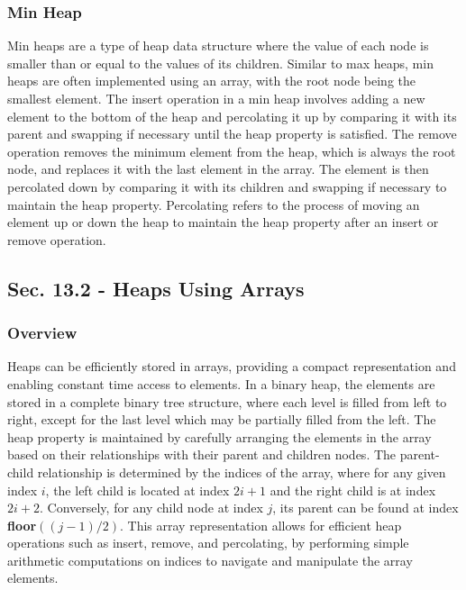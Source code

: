 \subsubsection{Min Heap}

Min heaps are a type of heap data structure where the value of each node is smaller than or equal to the values of its children. Similar to max heaps, min heaps are often implemented using an array, with 
the root node being the smallest element. The insert operation in a min heap involves adding a new element to the bottom of the heap and percolating it up by comparing it with its parent and swapping if 
necessary until the heap property is satisfied. The remove operation removes the minimum element from the heap, which is always the root node, and replaces it with the last element in the array. The element 
is then percolated down by comparing it with its children and swapping if necessary to maintain the heap property. Percolating refers to the process of moving an element up or down the heap to maintain the 
heap property after an insert or remove operation.

\subsection*{Sec. 13.2 - Heaps Using Arrays}

\subsubsection{Overview}

Heaps can be efficiently stored in arrays, providing a compact representation and enabling constant time access to elements. In a binary heap, the elements are stored in a complete binary tree structure, 
where each level is filled from left to right, except for the last level which may be partially filled from the left. The heap property is maintained by carefully arranging the elements in the array based 
on their relationships with their parent and children nodes. The parent-child relationship is determined by the indices of the array, where for any given index $i$, the left child is located at index $2i+1$ 
and the right child is at index $2i+2$. Conversely, for any child node at index $j$, its parent can be found at index \textbf{floor}$((j-1)/2)$. This array representation allows for efficient heap operations 
such as insert, remove, and percolating, by performing simple arithmetic computations on indices to navigate and manipulate the array elements.

